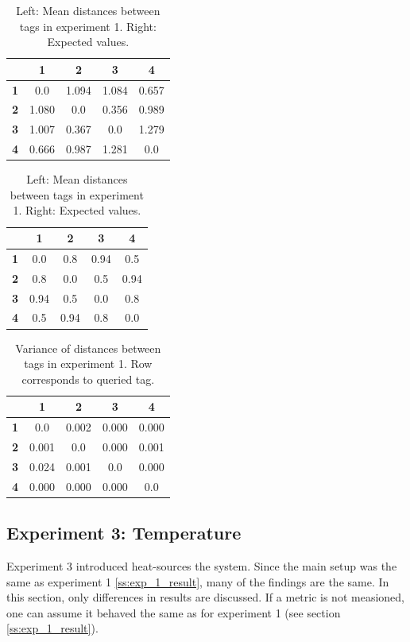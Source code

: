 \begin{table}[h!]
    \centering
    \begin{tabular}{|c|c c c c|}
        \hline
          & \textbf{1} & \textbf{2} & \textbf{3} & \textbf{4} \\
        \hline
		\textbf{1} & 0.0 & 1.094 & 1.084 & 0.657 \\
		\textbf{2} & 1.080 & 0.0 & 0.356 & 0.989 \\
		\textbf{3} & 1.007 & 0.367 & 0.0 & 1.279 \\
		\textbf{4} & 0.666 & 0.987 & 1.281 & 0.0 \\
        \hline
    \end{tabular}
\begin{tabular}{|c|c c c c|}
        \hline
          & \textbf{1} & \textbf{2} & \textbf{3} & \textbf{4} \\
        \hline
		\textbf{1} & 0.0 & 0.8 & 0.94 & 0.5 \\
		\textbf{2} & 0.8 & 0.0 & 0.5 & 0.94 \\
		\textbf{3} & 0.94 & 0.5 & 0.0 & 0.8 \\
		\textbf{4} & 0.5 & 0.94 & 0.8 & 0.0 \\
        \hline
\end{tabular}
    \caption{Left: Mean distances between tags in experiment 1. Right: Expected values.}
    \label{t:exp1_dist_means}
\end{table}

\begin{table}[h!]
    \centering
    \begin{tabular}{|c|c c c c|}
        \hline
          & \textbf{1} & \textbf{2} & \textbf{3} & \textbf{4} \\
        \hline
		\textbf{1} & 0.0 & 0.002 & 0.000 & 0.000 \\
		\textbf{2} & 0.001 & 0.0 & 0.000 & 0.001 \\
		\textbf{3} & 0.024 & 0.001 & 0.0 & 0.000 \\
		\textbf{4} & 0.000 & 0.000 & 0.000 & 0.0 \\
        \hline
    \end{tabular}
    \caption{Variance of distances between tags in experiment 1. Row corresponds to queried tag.}
    \label{t:exp1_dist_var}
\end{table}

\subsection{Experiment 3: Temperature}
\label{ss:exp_3_result}
Experiment 3 introduced heat-sources the system.
Since the main setup was the same as experiment 1 \ref{ss:exp_1_result}, many of the findings are the same.
In this section, only differences in results are discussed.
If a metric is not measioned, one can assume it behaved the same as for experiment 1  (see section \ref{ss:exp_1_result}).

